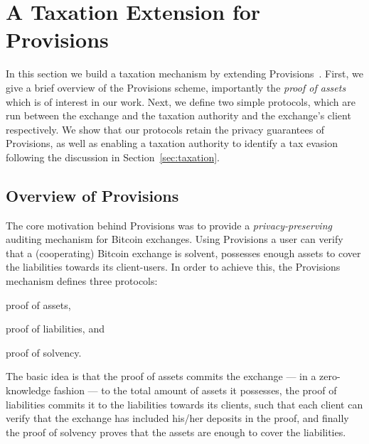 \section{A Taxation Extension for Provisions}\label{sec:provisions-extension}

In this section we build a taxation mechanism by extending
Provisions~\cite{CCS:DBBCB15}. First, we give a brief overview of the
Provisions scheme, importantly the \emph{proof of assets} which is of interest
in our work. Next, we define two simple protocols, which are run between the
exchange and the taxation authority and the exchange's client respectively. We
show that our protocols retain the privacy guarantees of Provisions, as well as
enabling a taxation authority to identify a tax evasion following the
discussion in Section~\ref{sec:taxation}.

\subsection{Overview of Provisions}\label{subsec:provisions-overview}

The core motivation behind Provisions was to provide a
\emph{privacy-preserving} auditing mechanism for Bitcoin exchanges. Using
Provisions a user can verify that a (cooperating) Bitcoin exchange is solvent,
\ie possesses enough assets to cover the liabilities towards its client-users.
In order to achieve this, the Provisions mechanism defines three protocols:
\begin{inparaenum}[i)]
    \item proof of assets,
    \item proof of liabilities, and
    \item proof of solvency.
\end{inparaenum}
The basic idea is that the proof of assets commits the exchange --- in a
zero-knowledge fashion --- to the total amount of assets it possesses, the
proof of liabilities commits it to the liabilities towards its clients, such
that each client can verify that the exchange has included his/her deposits in
the proof, and finally the proof of solvency proves that the assets are enough
to cover the liabilities.

